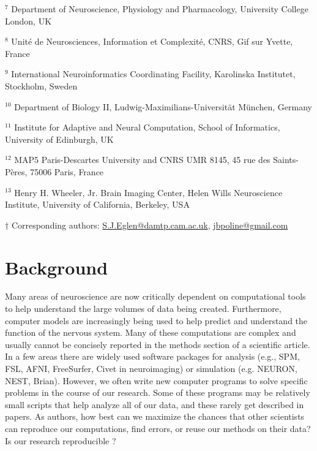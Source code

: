 \documentclass[11pt]{article}
\begin{document}
\noindent $^{7}$
Department of Neuroscience, Physiology and Pharmacology, 
University College London, UK


\noindent $^{8}$
Unit\'{e} de Neurosciences, Information et Complexit\'{e}, CNRS, Gif sur Yvette, France


\noindent $^{9}$
International Neuroinformatics Coordinating Facility, 
Karolinska Institutet, Stockholm, Sweden

\noindent $^{10}$
Department of Biology II, Ludwig-Maximilians-Universit\"{a}t
M\"{u}nchen, Germany

\noindent $^{11}$
Institute for Adaptive and Neural Computation, 
School of Informatics, University of Edinburgh, UK


\noindent $^{12}$ MAP5 Paris-Descartes University and CNRS UMR 8145, 
45 rue des Saints-P\`{e}res, 75006 Paris, France

\noindent $^{13}$  Henry H. Wheeler, Jr. Brain Imaging Center, Helen Wills Neuroscience Institute, University of California, Berkeley, USA

\vspace*{2mm}
\noindent $\dagger$
Corresponding authors: \url{S.J.Eglen@damtp.cam.ac.uk}, \url{jbpoline@gmail.com}

\clearpage


\renewcommand{\cite}[1]{\autocite{#1}}


\section*{Background}

Many areas of neuroscience are now critically dependent on
computational tools to help understand the large volumes of data being
created.  Furthermore, computer models are increasingly being used to
help predict and understand the function of the nervous system.  Many
of these computations are complex and usually cannot be concisely
reported in the methods section of a scientific article.  In a few
areas there are widely used software packages for
analysis (e.g., SPM, FSL, AFNI, FreeSurfer, Civet in
neuroimaging) or simulation (e.g. NEURON, NEST, Brian).
However, we often write new computer programs to solve
specific problems in the course of our research.  Some of these
programs may be relatively small scripts that help analyze all of our
data, and these rarely get described in papers.  As authors, how best
can we maximize the chances that other scientists can reproduce our
computations, find errors, or reuse our methods on their data?  Is our research
reproducible \cite{web:naturefocus}?
\end{document}
